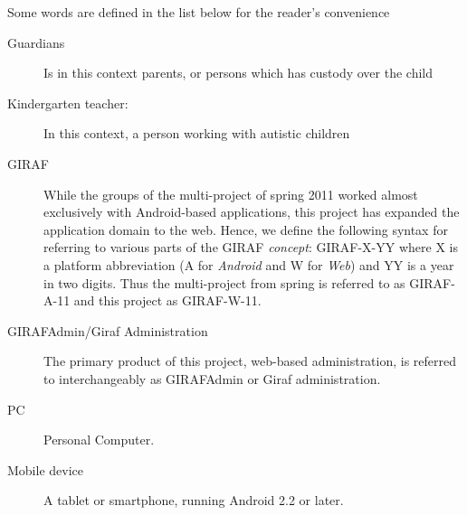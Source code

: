 Some words are defined in the list below for the reader's convenience
\begin{description}
\item[Guardians] Is in this context parents, or persons which has custody over the child
\item[Kindergarten teacher:] In this context, a person working with autistic children
\item[GIRAF] While the groups of the multi-project of spring 2011 worked almost exclusively with Android-based applications, this project has expanded the application domain to the web. Hence, we define the following syntax for referring to various parts of the GIRAF \emph{concept}: GIRAF-X-YY where X is a platform abbreviation (A for \emph{Android} and W for \emph{Web}) and YY is a year in two digits. Thus the multi-project from spring is referred to as GIRAF-A-11 and this project as GIRAF-W-11.
\item[GIRAFAdmin/Giraf Administration] The primary product of this project, web-based administration, is referred to interchangeably as GIRAFAdmin or Giraf administration.
\item[PC] Personal Computer.
\item[Mobile device] A tablet or smartphone, running Android 2.2 or later.
\end{description}


